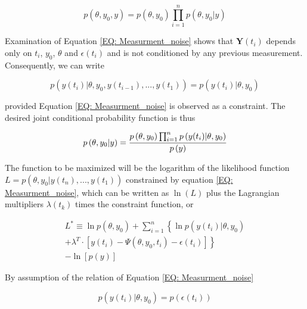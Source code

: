 \documentclass[a4paper,fleqn]{cas-dc}
\begin{document}
{\footnotesize
\begin{equation}
	p\left( \theta,y_0,y \right) = p\left( \theta,y_0 \right) \prod_{i=1}^{n} p\left( \theta,y_0|y \right)
\end{equation} }

Examination of Equation \ref{EQ: Measurment_noise} shows that $\textbf{Y}(t_i)$ depends only on $t_i$, $y_0$, $\theta$ and $\epsilon(t_i)$ and is not conditioned by any previous measurement. Consequently, we can write 

{\footnotesize
\begin{equation}
	p\left( y(t_i)|\theta,y_0, y(t_{i-1}),...,y(t_1) \right) = p\left( y(t_i)|\theta,y_0 \right)
\end{equation} }

provided Equation \ref{EQ: Measurment_noise} is observed as a constraint. The desired joint conditional probability function is thus

{\footnotesize
\begin{equation}
	p\left( \theta,y_0|y \right) = \cfrac{p\left( \theta,y_0 \right) \prod_{i=1}^{n} p\left( y(t_i)|\theta,y_0 \right) }{p\left( y \right)}
\end{equation} }

The function to be maximized will be the logarithm of the likelihood function $L = p\left( \theta,y_0| y(t_n),...,y(t_1) \right)$ constrained by equation \ref{EQ: Measurment_noise}, which can be written as $\ln(L)$ plus the Lagrangian multipliers $\lambda(t_k)$ times the constraint function, or

{\footnotesize
\begin{equation} \label{EQ: MLE_Lagrangian}
	\begin{split}
		L^* \equiv \ln p\left( \theta,y_0 \right) + \sum_{i=1}^{n} \left\{ \ln p(y(t_i)|\theta,y_0) \right. \\
		\left. + \lambda^T \cdot \left[ y(t_i) - \Psi\left( \theta,y_0,t_i \right) - \epsilon(t_i) \right] \right\} \\ - \ln \left[ p\left( y \right) \right]
	\end{split}
\end{equation}}

By assumption of the relation of Equation \ref{EQ: Measurment_noise}

{\footnotesize
\begin{equation} \label{EQ: Noise_prob}
	p\left( y(t_i) | \theta,y_0 \right) = p\left( \epsilon(t_i) \right)
\end{equation} }
\end{document}
